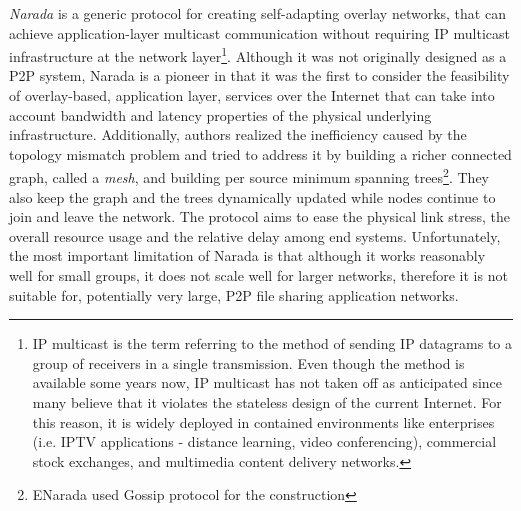 
\emph{Narada} \cite{CRZ2000,CRSZ2001,CRSZ2002} is a generic
protocol for creating self-adapting overlay networks, that can achieve
application-layer multicast communication without requiring IP multicast
infrastructure at the network layer\footnote{
  IP multicast is the term referring to the method of sending IP datagrams to a
  group of receivers in a single transmission. Even though the method is
  available some years now, IP multicast has not taken off as anticipated since
  many believe that it violates the stateless design of the current Internet.
  For this reason, it is widely deployed in contained environments like
  enterprises (i.e. IPTV applications - distance learning, video conferencing),
  commercial stock exchanges, and multimedia content delivery networks.
}. Although it was not originally designed as a P2P system, Narada is
a pioneer in that 
it was the first to consider the feasibility of overlay-based, application
layer, services over the Internet that can take into account bandwidth and
latency properties of the physical underlying infrastructure. Additionally,
authors realized the inefficiency caused by the topology mismatch problem and
tried to address it by building a richer connected graph, called a
\emph{mesh}, and building per source minimum spanning trees\footnote{
  ENarada \cite{LYL2008} used Gossip protocol for the
construction
}.
They also keep the graph and the trees
dynamically updated while nodes continue to join and leave the network.
The protocol aims to ease the physical link stress, the overall
resource usage and the relative delay among end systems. Unfortunately, the most
important limitation of Narada is that although it works reasonably well for
small groups, it does not scale well for larger networks, therefore it is not
suitable for, potentially very large, P2P file sharing application networks.


